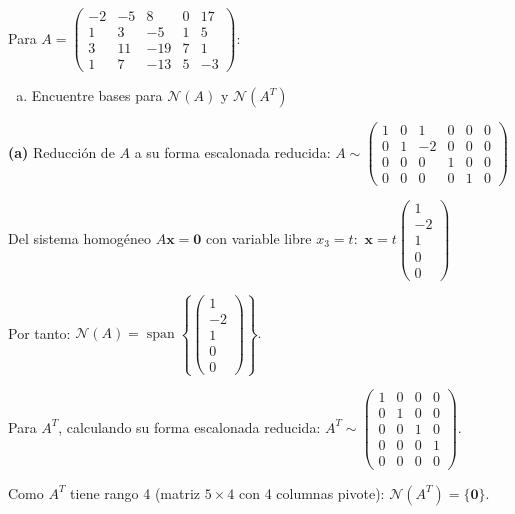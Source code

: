 \begin{prob} Para $A = \begin{pmatrix} -2 & -5 & 8 & 0 & 17 \\ 1 & 3 & -5 & 1 & 5 \\ 3 & 11 & -19 & 7 & 1 \\ 1 & 7 & -13 & 5 & -3 \end{pmatrix}$:
\begin{enumerate}[(a)]
\item Encuentre bases para $\mathcal{N}(A)$ y $\mathcal{N}(A^T)$
\end{enumerate}

\begin{myproof}
\textbf{(a)} Reducción de $A$ a su forma escalonada reducida: $A \sim \begin{pmatrix} 1 & 0 & 1 & 0 & 0 & 0 \\
0 & 1 & -2 & 0 & 0 & 0 \\
0 & 0 & 0 & 1 & 0 & 0 \\
0 & 0 & 0 & 0 & 1 & 0 \end{pmatrix}$

Del sistema homogéneo $A\mathbf{x} = \mathbf{0}$ con variable libre $x_3=t:$ $\mathbf{x} = t\begin{pmatrix}1\\-2\\1\\0\\0\end{pmatrix}$

Por tanto: $\mathcal{N}(A) = \operatorname{span}\left\{ \begin{pmatrix}1\\-2\\1\\0\\0\end{pmatrix}\right\}.$

Para $A^T$, calculando su forma escalonada reducida: $A^T \sim \begin{pmatrix} 1 & 0 & 0 & 0 \\ 0 & 1 & 0 & 0 \\ 0 & 0 & 1 & 0 \\ 0 & 0 & 0 & 1 \\ 0 & 0 & 0 & 0 \end{pmatrix}.$

Como $A^T$ tiene rango 4 (matriz $5 \times 4$ con 4 columnas pivote): $\mathcal{N}(A^T) = \{\mathbf{0}\}.$
\end{myproof}
\end{prob}


